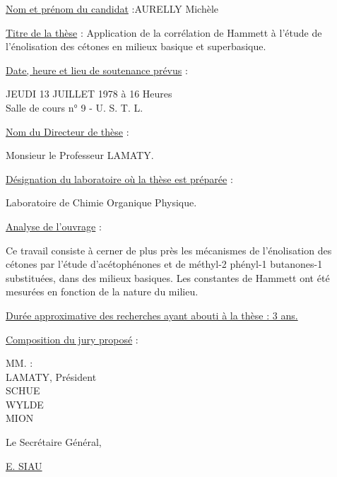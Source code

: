 \uline{Nom et prénom du candidat} :\qquad AURELLY Michèle

\uline{Titre de la thèse} : Application de la corrélation de Hammett à l'étude de
l'énolisation des cétones en milieux basique et superbasique.

\uline{Date, heure et lieu de soutenance prévus} :
\begin{flushright}
JEUDI 13 JUILLET 1978 à 16 Heures\\
Salle de cours n° 9 - U. S. T. L.
\end{flushright}

\uline{Nom du Directeur de thèse} :
\begin{flushright}Monsieur le Professeur LAMATY.\end{flushright}

\uline{Désignation du laboratoire où la thèse est préparée} :
\begin{flushright}Laboratoire de Chimie Organique Physique.\end{flushright}

\uline{Analyse de l'ouvrage} :

Ce travail consiste à cerner de plus près
les mécanismes de l'énolisation des cétones par l'étude d'acétophénones et
de méthyl-2 phényl-1 butanones-1 substituées, dans des milieux basiques.
Les constantes  de Hammett ont été mesurées en fonction de la nature du milieu.

\uline{Durée approximative des recherches ayant abouti à la thèse : 3 ans.}

\uline{Composition du jury proposé} :
\begin{center}
MM. :\\
LAMATY, Président\\
SCHUE\\
WYLDE\\
MION
\end{center}

\begin{flushright}
Le Secrétaire Général,


\uline{E. SIAU}
\end{flushright}

